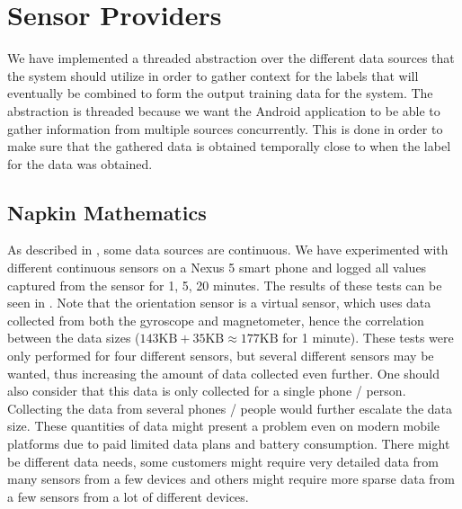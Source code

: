 
\section{Sensor Providers}
\label{sec:sensor_providers}

We have implemented a threaded abstraction over the different data sources that the system should utilize in order to gather context for the labels that will eventually be combined to form the output training data for the system. The abstraction is threaded because we want the Android application to be able to gather information from multiple sources concurrently. This is done in order to make sure that the gathered data is obtained temporally close to when the label for the data was obtained. 

\subsection{Napkin Mathematics}
\label{sub:napkin_mathematics}

As described in , some data sources are continuous. We have experimented with different continuous sensors on a Nexus 5 smart phone and logged all values captured from the sensor for 1, 5, 20 minutes. The results of these tests can be seen in . Note that the orientation sensor is a virtual sensor, which uses data collected from both the gyroscope and magnetometer, hence the correlation between the data sizes ($143 \text{KB} + 35  \text{KB} \approx 177  \text{KB}$ for 1 minute). These tests were only performed for four different sensors, but several different sensors may be wanted, thus increasing the amount of data collected even further. One should also consider that this data is only collected for a single phone / person. Collecting the data from several phones / people would further escalate the data size. These quantities of data might present a problem even on modern mobile platforms due to paid limited data plans and battery consumption. There might be different data needs, some customers might require very detailed data from many sensors from a few devices and others might require more sparse data from a few sensors from a lot of different devices. 

